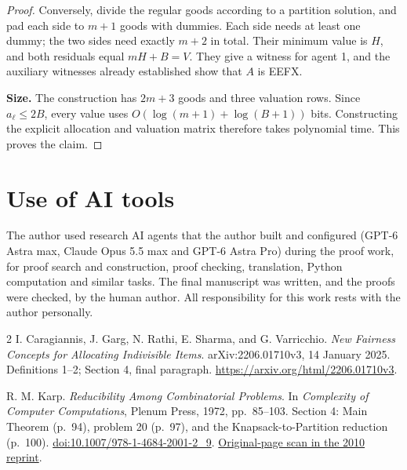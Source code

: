\documentclass[11pt]{article}
\begin{document}
\begin{proof}
Conversely, divide the regular goods according to a partition solution,
and pad each side to $m+1$ goods with dummies. Each side needs at least
one dummy; the two sides need exactly $m+2$ in total. Their minimum
value is $H$, and both residuals equal $mH+B=V$. They give a witness
for agent 1, and the auxiliary witnesses already established show that
$A$ is EEFX.

\textbf{Size.}
The construction has $2m+3$ goods and three valuation rows.
Since $a_\ell\leq2B$, every value uses
$O(\log(m+1)+\log(B+1))$ bits. Constructing the explicit allocation and
valuation matrix therefore takes polynomial time. This proves the claim.
\end{proof}

\section*{Use of AI tools}
The author used research AI agents that the author built and configured (GPT-6 Astra max,
Claude Opus 5.5 max and GPT-6 Astra Pro) during the proof work, for proof search and
construction, proof checking, translation, Python computation and similar tasks. The final
manuscript was written, and the proofs were checked, by the human author. All responsibility
for this work rests with the author personally.

\begin{thebibliography}{2}
\small
{}
I. Caragiannis, J. Garg, N. Rathi, E. Sharma, and G. Varricchio.
\emph{New Fairness Concepts for Allocating Indivisible Items}.
arXiv:2206.01710v3, 14 January 2025.
Definitions 1--2; Section 4, final paragraph.
\url{https://arxiv.org/html/2206.01710v3}.

R. M. Karp. \emph{Reducibility Among Combinatorial Problems}.
In \emph{Complexity of Computer Computations}, Plenum Press, 1972,
pp.~85--103. Section 4: Main Theorem (p.~94), problem 20 (p.~97),
and the Knapsack-to-Partition reduction (p.~100).
\href{https://doi.org/10.1007/978-1-4684-2001-2_9}{doi:10.1007/978-1-4684-2001-2\_9}.
\href{https://www.cs.umd.edu/~gasarch/BLOGPAPERS/Karp.pdf}{Original-page scan in the 2010 reprint}.
\end{thebibliography}
\end{document}
